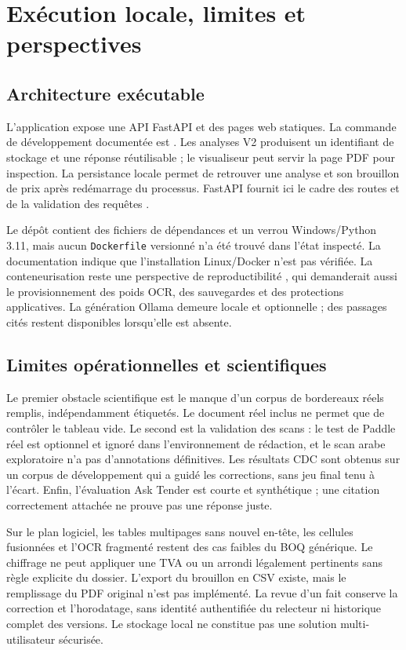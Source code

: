 \chapter{Exécution locale, limites et perspectives}\label{chap:deploiement}
\section{Architecture exécutable}
L'application expose une API FastAPI et des pages web statiques. La commande de développement documentée est \texttt{}. Les analyses V2 produisent un identifiant de stockage et une réponse réutilisable ; le visualiseur peut servir la page PDF pour inspection. La persistance locale permet de retrouver une analyse et son brouillon de prix après redémarrage du processus. FastAPI fournit ici le cadre des routes et de la validation des requêtes \cite{fastapi}.

Le dépôt contient des fichiers de dépendances et un verrou Windows/Python 3.11, mais aucun \texttt{Dockerfile} versionné n'a été trouvé dans l'état inspecté. La documentation indique que l'installation Linux/Docker n'est pas vérifiée. La conteneurisation reste une perspective de reproductibilité \cite{docker}, qui demanderait aussi le provisionnement des poids OCR, des sauvegardes et des protections applicatives. La génération Ollama demeure locale et optionnelle ; des passages cités restent disponibles lorsqu'elle est absente.

\section{Limites opérationnelles et scientifiques}
Le premier obstacle scientifique est le manque d'un corpus de bordereaux réels remplis, indépendamment étiquetés. Le document réel inclus ne permet que de contrôler le tableau vide. Le second est la validation des scans : le test de Paddle réel est optionnel et ignoré dans l'environnement de rédaction, et le scan arabe exploratoire n'a pas d'annotations définitives. Les résultats CDC sont obtenus sur un corpus de développement qui a guidé les corrections, sans jeu final tenu à l'écart. Enfin, l'évaluation Ask Tender est courte et synthétique ; une citation correctement attachée ne prouve pas une réponse juste.

Sur le plan logiciel, les tables multipages sans nouvel en-tête, les cellules fusionnées et l'OCR fragmenté restent des cas faibles du BOQ générique. Le chiffrage ne peut appliquer une TVA ou un arrondi légalement pertinents sans règle explicite du dossier. L'export du brouillon en CSV existe, mais le remplissage du PDF original n'est pas implémenté. La revue d'un fait conserve la correction et l'horodatage, sans identité authentifiée du relecteur ni historique complet des versions. Le stockage local ne constitue pas une solution multi-utilisateur sécurisée.

